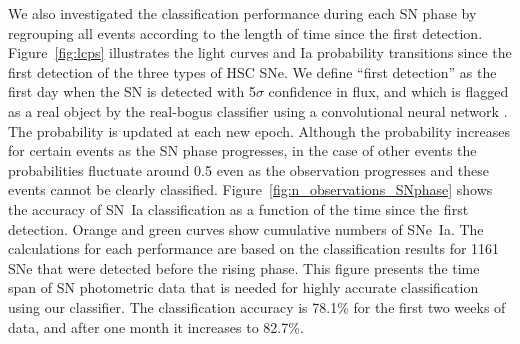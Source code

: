 \documentclass[useamsfonts]{pasj01}
\begin{document}
We also investigated the classification performance during each SN phase by regrouping all events according to the length of time since the first detection.
Figure\ \ref{fig:lcps} illustrates the light curves and Ia probability transitions since the first detection of the three types of HSC SNe.
We define ``first detection'' as the first day when the SN is detected with 5$\sigma$ confidence in flux, and which is flagged as a real object by the real-bogus classifier using a convolutional neural network \citep{yasuda19a}.
The probability is updated at each new epoch.
Although the probability increases for certain events as the SN phase progresses, in the case of other events the probabilities fluctuate around 0.5 even as the observation progresses and these events cannot be clearly classified.
Figure\ \ref{fig:n_observations_SNphase} shows the accuracy of SN~Ia classification as a function of the time since the first detection. Orange and green curves show cumulative numbers of SNe~Ia.
The calculations for each performance are based on the classification results for 1161 SNe that were detected before the rising phase.
This figure presents the time span of SN photometric data that is needed for highly accurate classification using our classifier.
The classification accuracy is 78.1\% for the first two weeks of data, and after one month it increases to 82.7\%.
\end{document}
